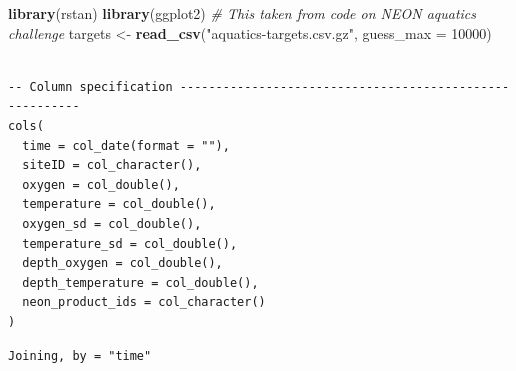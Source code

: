 \documentclass[
]{article}
\newenvironment{Shaded}{\begin{snugshade}}{\end{snugshade}}
\newcommand{\CommentTok}[1]{\textcolor[rgb]{0.56,0.35,0.01}{\textit{#1}}}
\newcommand{\DataTypeTok}[1]{\textcolor[rgb]{0.13,0.29,0.53}{#1}}
\newcommand{\DecValTok}[1]{\textcolor[rgb]{0.00,0.00,0.81}{#1}}
\newcommand{\KeywordTok}[1]{\textcolor[rgb]{0.13,0.29,0.53}{\textbf{#1}}}
\newcommand{\NormalTok}[1]{#1}
\newcommand{\OperatorTok}[1]{\textcolor[rgb]{0.81,0.36,0.00}{\textbf{#1}}}
\newcommand{\StringTok}[1]{\textcolor[rgb]{0.31,0.60,0.02}{#1}}
\begin{document}
\begin{Shaded}
\begin{Highlighting}[]
\KeywordTok{library}\NormalTok{(rstan)}
\KeywordTok{library}\NormalTok{(ggplot2)}
\CommentTok{# This taken from code on NEON aquatics challenge}
\NormalTok{targets <-}\StringTok{ }\KeywordTok{read_csv}\NormalTok{(}\StringTok{"aquatics-targets.csv.gz"}\NormalTok{, }\DataTypeTok{guess_max =} \DecValTok{10000}\NormalTok{)}
\end{Highlighting}
\end{Shaded}

\begin{verbatim}

-- Column specification --------------------------------------------------------
cols(
  time = col_date(format = ""),
  siteID = col_character(),
  oxygen = col_double(),
  temperature = col_double(),
  oxygen_sd = col_double(),
  temperature_sd = col_double(),
  depth_oxygen = col_double(),
  depth_temperature = col_double(),
  neon_product_ids = col_character()
)
\end{verbatim}

\begin{Shaded}
\end{Shaded}

\begin{verbatim}
Joining, by = "time"
\end{verbatim}
\end{document}
